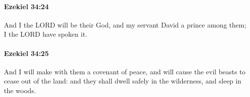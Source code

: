 		\paragraph{Ezekiel 34:24} %
			\label{EZEKIEL-34-24}

			And I the LORD will be their God, and my servant David a prince among them; I the LORD have spoken it.


		\paragraph{Ezekiel 34:25} %
			\label{EZEKIEL-34-25}

			And I will make with them a covenant of peace, and will cause the evil beasts to cease out of the land: and they shall dwell safely in the wilderness, and sleep in the woods.


